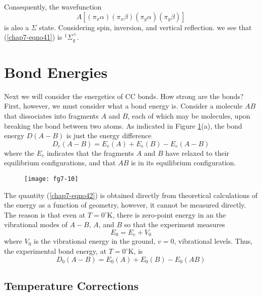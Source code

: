 Consequently, the wavefunction
\begin{equation}
A \left[ \left( \pi_x \alpha \right) \left( \pi_x \beta \right) 
\left( \pi_y \alpha \right) \left( \pi_y \beta \right) 
\right]
\label{chap07-eqno41}
\end{equation}
is also a $\Sigma$ state.  Considering spin, inversion, and vertical
reflection. we see that (\ref{chap7-eqno41}) is ${^1\Sigma}^+_g$.

\bigskip

\section{Bond Energies}

Next we will consider the energetics of CC bonds.  How strong are the
bonds?  First, however, we must consider what a bond energy is.
Consider a molecule $AB$ that dissociates into fragments $A$ and $B$,
each of which may be molecules, upon breaking the bond between two
atoms.  As indicated in Figure \ref{chap7-fig10}(a), the bond energy
$D(A - B)$ is just the energy difference
\begin{equation}
D_e (A-B) = E_e (A) + E_e (B) - E_e (A-B)
\label{chap07-eqno42}
\end{equation}
where the $E_e$ indicates that the fragments $A$ and $B$ have relaxed to 
their equilibrium configurations, and that $AB$ is in its equilibrium 
configuration.



\begin{figure}
\texttt{[image: fg7-10]}
\caption{}
\label{chap7-fig10}
\end{figure}


The quantity (\ref{chap7-eqno42}) is obtained directly from
theoretical calculations of the energy as a function of geometry,
however, it cannot be measured directly.  The reason is that even at
$T = 0^{\circ}$K, there is zero-point energy in an the vibrational
modes of $A-B$, $A$, and $B$ so that the experiment measures
\begin{equation}
E_0 = E_e + V_0
\label{chap07-eqno43}
\end{equation}
where $V_0$ is the vibrational energy in the ground, $v = 0$, vibrational 
levels.  Thus, the experimental bond energy, at $T = 0^{\circ}$K, is
\begin{equation}
D_0 (A - B) = E_0 (A) + E_0 (B) - E_0 (AB)
\label{chap07-eqno44}
\end{equation}

\subsection{Temperature Corrections}

